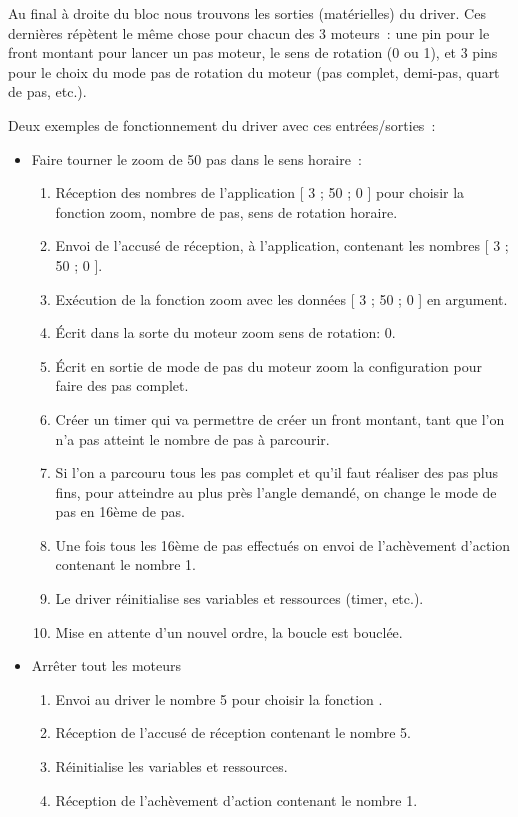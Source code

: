 \vspace{1cm}

Au final à droite du bloc nous trouvons les sorties (matérielles) du driver. Ces dernières répètent le même chose pour chacun des 3 moteurs~: une pin pour le front montant pour lancer un pas moteur, le sens de rotation (0 ou 1), et 3 pins pour le choix du mode pas de rotation du moteur (pas complet, demi-pas, quart de pas, etc.).

\vspace{1cm}
  
Deux exemples de fonctionnement du driver avec ces entrées/sorties~:
\begin{itemize}[label=$\bullet$]
	\item Faire tourner le zoom de 50 pas dans le sens horaire~:
	\begin{enumerate}
		\item Réception des nombres de l'application [ 3 ; 50 ; 0 ] pour choisir la fonction zoom, nombre de pas, sens de rotation horaire.
		\item Envoi de l'accusé de réception, à l'application, contenant les nombres [ 3 ; 50 ; 0 ].
		\item Exécution de la fonction zoom avec les données [ 3 ; 50 ; 0 ] en argument.
		\item Écrit dans la sorte du moteur zoom sens de rotation: 0.
		\item Écrit en sortie de mode de pas du moteur zoom la configuration pour faire des pas complet. 
		\item Créer un timer qui va permettre de créer un front montant, tant que l'on n'a pas atteint le nombre de pas à parcourir.
		\item Si l'on a parcouru tous les pas complet et qu'il faut réaliser des pas plus fins, pour atteindre au plus près l'angle demandé, on change le mode de pas en 16ème de pas. 
		\item Une fois tous les 16ème de pas effectués on envoi de l'achèvement d'action contenant le nombre 1.
		\item Le driver réinitialise ses variables et ressources (timer, etc.).
		\item Mise en attente d'un nouvel ordre, la boucle est bouclée.
		\end{enumerate}
	\item Arrêter tout les moteurs
	\begin{enumerate}
		\item Envoi au driver le nombre 5 pour choisir la fonction .
		\item Réception de l'accusé de réception contenant le nombre 5.
		\item Réinitialise les variables et ressources.
		\item Réception de l'achèvement d'action contenant le nombre 1.
		\end{enumerate}
	\end{itemize}

